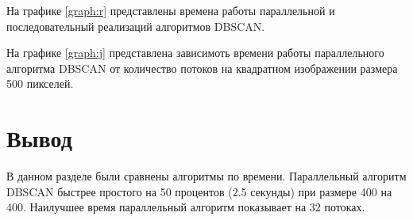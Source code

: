 На графике \ref{graph:r} представлены времена работы параллельной и последовательный реализаций алгоритмов DBSCAN.



На графике \ref{graph:j} представлена зависимоть времени работы параллельного алгоритма DBSCAN от количество потоков на квадратном изображении размера 500 пикселей.

\newpage

\section*{Вывод}

В данном разделе были сравнены алгоритмы по времени.
Параллельный алгоритм DBSCAN быстрее простого на 50 процентов (2.5 секунды) при размере 400 на 400.
Наилучшее время параллельный алгоритм показывает на 32 потоках.  
 
